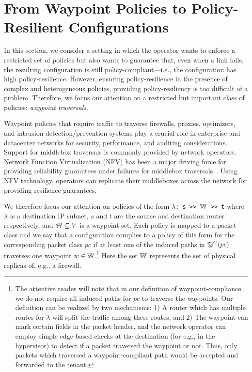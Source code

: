 \section{From Waypoint Policies to Policy-Resilient Configurations}
\label{sec:waypointres}

In this section, we consider a setting in which the operator 
wants to 
enforce a restricted set of policies but also wants to guarantee
that, even when a link fails, the resulting configuration is still policy-compliant---i.e.,
the configuration has high policy-resilience.
However, ensuring policy-resilience in the presence of complex and heterogeneous policies,
providing  policy-resiliency is too difficult of a problem.
Therefore, we focus our attention on a restricted but important class of
policies: 
\emph{waypoint traversals}.

Waypoint policies 
that require traffic to traverse
firewalls,
proxies, optimizers, and intrusion detection/prevention 
systems 
play a crucial role in enterprise and
datacenter networks for security, performance,  
and auditing considerations.
Support for  
middlebox traversals is commonly 
provided by network operators.
Network Function Virtualization (NFV) has been a 
major driving force for providing reliability 
guarantees under failures  
for middlebox traversals~\cite{opennf, netbricks}. 
Using NFV technology, operators can replicate 
their middleboxes across the network for providing 
resilience guarantees. 

We therefore focus our attention on policies of the form 
\texttt{$\lambda$: s >> $\mathbb{W}$ >> t}
where $\lambda$ is a destination IP subnet,  
$s$ and $t$ are the source and destination router respectively, 
and $\mathbb{W} \subseteq V$ is a waypoint set. 
Each policy is mapped to a packet class and
we say that a configuration complies to a policy of this form for the corresponding packet class
$pc$ if
at least one of the induced paths in $\mathfrak{P}^C(pc)$ 
traverses one waypoint $w \in \mathbb{W}$.\footnote{
The attentive reader will note that in our definition of waypoint-compliance 
we do not require all induced paths for $pc$ to traverse the waypoints. 
Our 
definition can be realized by two mechanisms: 1) A router
which has multiple routes for $\lambda$ will split the traffic
among these routes, and 2) The waypoint can mark certain fields in
the packet header, and the network operator can employ 
simple edge-based checks at the destination 
(for e.g., in the hypervisor) to 
detect if a packet traversed the waypoint or not. Thus, only
packets which traversed a waypoint-compliant path would be 
accepted and forwarded to the tenant. 
}
Here the set $\mathbb{W}$
represents the set of physical replicas of, e.g., a firewall.



